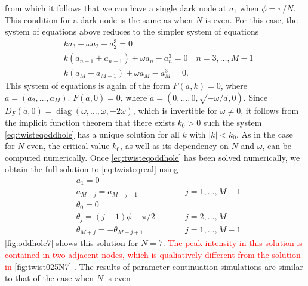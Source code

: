 \documentclass[reprint, amsmath,amssymb,aps,pra]{revtex4-2}
\DeclareMathOperator{\diag}{diag}
\renewcommand{\revised}[1]{ \textcolor{red}{#1} }
\begin{document}
from which it follows that we can have a single dark node at $a_1$ when $\phi = \pi/N$. This condition for a dark node is the same as when $N$ is even. For this case, the system of equations above reduces to the simpler system of equations
\begin{equation}\label{eq:twisteqoddhole}
\begin{aligned}
& k a_3 + \omega a_2 - a_2^3 = 0\\
&k( a_{n+1} + a_{n-1} ) + \omega a_n - a_n^3 = 0 \quad n = 3, \dots, M-1 \\
&k ( a_M + a_{M-1} ) + \omega a_M - a_M^3 = 0.
\end{aligned}
\end{equation}
This system of equations is again of the form $F(a,k) = 0$, where $a = (a_2, \dots, a_M)$. $F(\tilde{a}, 0) = 0$, where $\tilde{a} = (0, \dots, 0, \sqrt{-\omega/d}, 0)$. Since $D_F(\tilde{a}, 0) = \diag(\omega, \dots, \omega, -2\omega)$, which is invertible for $\omega \neq 0$, it follows from the implicit function theorem that there exists $k_0 > 0$ such the system \cref{eq:twisteqoddhole} has a unique solution for all $k$ with $|k| < k_0$. As in the case for $N$ even, the critical value $k_0$, as well as its dependency on $N$ and $\omega$, can be computed numerically. Once \cref{eq:twisteqoddhole} has been solved numerically, we obtain the full solution to \cref{eq:twisteqreal} using
\begin{align*}
&a_1 = 0 \\
&a_{M+j} = a_{M-j+1} && \qquad j = 1, \dots, M-1 \\
&\theta_0 = 0 \\
&\theta_j = (j-1)\phi - \pi/2 && \qquad j = 2, \dots, M \\
&\theta_{M+j} = -\theta_{M-j+1} && \qquad j = 1, \dots, M-1
\end{align*}
\cref{fig:oddhole7} shows this solution for $N=7$. \revised{The peak intensity in this solution is contained in two adjacent nodes, which is qualiatively different from the solution in \cref{fig:twist025N7}}. The results of parameter continuation simulations are similar to that of the case when $N$ is even
\end{document}
